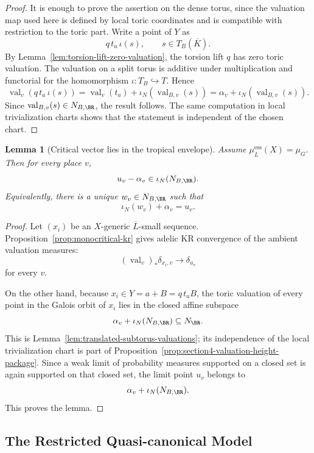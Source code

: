 \documentclass[10pt,a4paper]{amsart}
\theoremstyle{plain}
\newtheorem{lemma}[theorem]{Lemma}
\DeclareMathOperator{\val}{val}
\theoremstyle{plain}
\numberwithin{equation}{section}
\providecommand{\bL}{\overline{L}}
\providecommand{\muess}{\mu^{\mathrm{ess}}}
\begin{document}
\begin{proof}
	It is enough to prove the assertion on the dense torus, since the valuation map
	used here is defined by local toric coordinates and is compatible with
	restriction to the toric part.  Write a point of \(Y\) as
	\[
	q\,t_a\,\iota(s),\qquad s\in T_B(\overline K).
	\]
	By Lemma~\ref{lem:torsion-lift-zero-valuation}, the torsion lift \(q\) has
	zero toric valuation.  The valuation on a split torus is additive under
	multiplication and functorial for the homomorphism
	\(\iota:T_B\hookrightarrow T\).  Hence
	\[
	\val_v(q\,t_a\,\iota(s))
	=
	\val_v(t_a)+\iota_N(\val_{B,v}(s))
	=
	\alpha_v+\iota_N(\val_{B,v}(s)).
	\]
	Since \(\val_{B,v}(s)\in N_{B,\BR}\), the result follows.  The same computation
	in local trivialization charts shows that the statement is independent of the
	chosen chart.
\end{proof}

\begin{lemma}[Critical vector lies in the tropical envelope]\label{lem:tropical-envelope}
	Assume \(\muess_{\bL}(X)=\mu_G\).  Then for every place \(v\),
	\[
	u_v-\alpha_v\in \iota_N(N_{B,\BR}).
	\]
	Equivalently, there is a unique \(w_v\in N_{B,\BR}\) such that
	\[
	\iota_N(w_v)+\alpha_v=u_v.
	\]
\end{lemma}

\begin{proof}
	Let \((x_i)\) be an \(X\)-generic \(\bL\)-small sequence.
	Proposition~\ref{prop:monocritical-kr} gives
	adelic KR convergence of the ambient valuation measures:
	\[
	(\val_v)_*\delta_{x_i,v}\longrightarrow\delta_{u_v}
	\]
	for every \(v\).
	
	On the other hand, because \(x_i\in Y=a+B=q\,t_aB\), the toric valuation of
	every point in the Galois orbit of \(x_i\) lies in the closed affine subspace
	\[
	\alpha_v+\iota_N(N_{B,\BR})\subseteq N_{\BR}.
	\]
	This is Lemma~\ref{lem:translated-subtorus-valuations}; its independence of
	the local trivialization chart is part of
	Proposition~\ref{prop:section4-valuation-height-package}.
	Since a weak limit of probability measures supported on a closed set is again
	supported on that closed set, the limit point \(u_v\) belongs to
	\[
	\alpha_v+\iota_N(N_{B,\BR}).
	\]
	This proves the lemma.
\end{proof}

\subsection{The Restricted Quasi-canonical Model}
\end{document}
